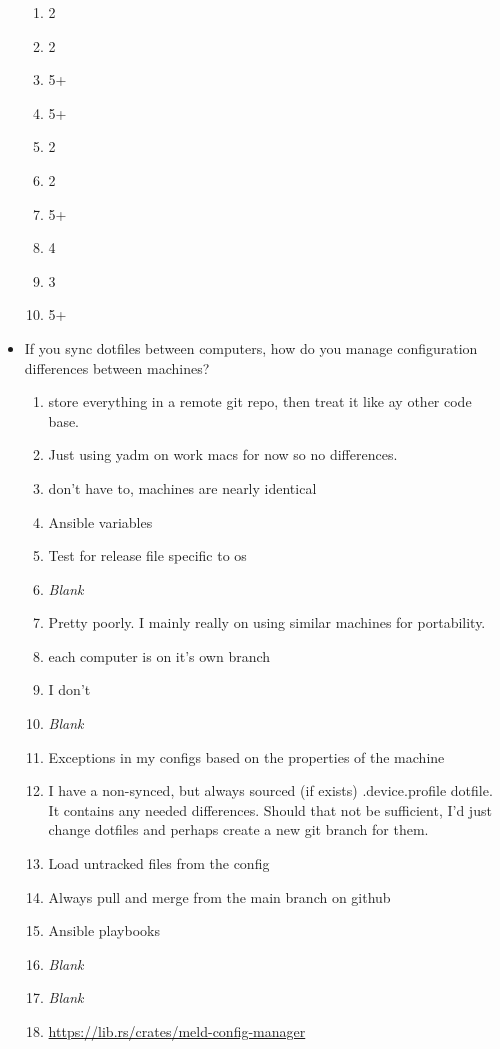 \documentclass[letterpaper]{jdf}
\begin{document}
\begin{itemize}
\begin{enumerate}
        \item 2
        \item 2
        \item 5+
        \item 5+
        \item 2
        \item 2
        \item 5+
        \item 4
        \item 3
        \item 5+
    \end{enumerate}
    \item If you sync dotfiles between computers, how do you manage configuration differences between machines?
    \begin{enumerate}
        \item store everything in a remote git repo, then treat it like ay other code base.
        \item Just using yadm on work macs for now so no differences.
        \item don't have to, machines are nearly identical
        \item Ansible variables
        \item Test for release file specific to os
        \item \emph{Blank}
        \item Pretty poorly. I mainly really on using similar machines for portability.
        \item each computer is on it's own branch
        \item I don't
        \item \emph{Blank}
        \item Exceptions in my configs based on the properties of the machine
        \item I have a non-synced, but always sourced (if exists) .device.profile dotfile. It contains any needed differences. Should that not be sufficient, I'd just change dotfiles and perhaps create a new git branch for them.
        \item Load untracked files from the config
        \item Always pull and merge from the main branch on github
        \item Ansible playbooks
        \item \emph{Blank}
        \item \emph{Blank}
        \item \href{https://lib.rs/crates/meld-config-manager}{https://lib.rs/crates/meld-config-manager}

\end{enumerate}
\end{itemize}
\end{document}
